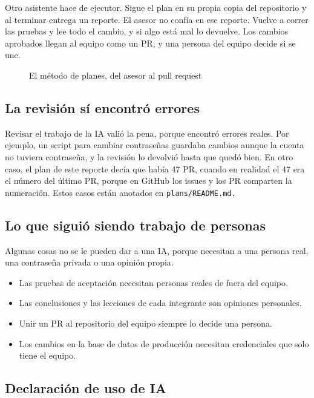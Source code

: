 Otro asistente hace de ejecutor. Sigue el plan en su propia copia del repositorio y al terminar entrega un reporte. El asesor no confía en ese reporte. Vuelve a correr las pruebas y lee todo el cambio, y si algo está mal lo devuelve. Los cambios aprobados llegan al equipo como un PR, y una persona del equipo decide si se une.

\begin{figure}[H]
  \centering
  
  \caption{El método de planes, del asesor al pull request}\label{fig:agentes}
\end{figure}

\subsection{La revisión sí encontró errores}\label{sec:errores}

Revisar el trabajo de la IA valió la pena, porque encontró errores reales. Por ejemplo, un script para cambiar contraseñas guardaba cambios aunque la cuenta no tuviera contraseña, y la revisión lo devolvió hasta que quedó bien. En otro caso, el plan de este reporte decía que había 47 PR, cuando en realidad el 47 era el número del último PR, porque en GitHub los issues y los PR comparten la numeración. Estos casos están anotados en \tt{plans/README.md}.

\subsection{Lo que siguió siendo trabajo de personas}\label{sec:humano}

Algunas cosas no se le pueden dar a una IA, porque necesitan a una persona real, una contraseña privada o una opinión propia.

\begin{itemize}
  \item Las pruebas de aceptación necesitan personas reales de fuera del equipo.
  \item Las conclusiones y las lecciones de cada integrante son opiniones personales.
  \item Unir un PR al repositorio del equipo siempre lo decide una persona.
  \item Los cambios en la base de datos de producción necesitan credenciales que solo tiene el equipo.
\end{itemize}

\subsection{Declaración de uso de IA}\label{sec:ia}

